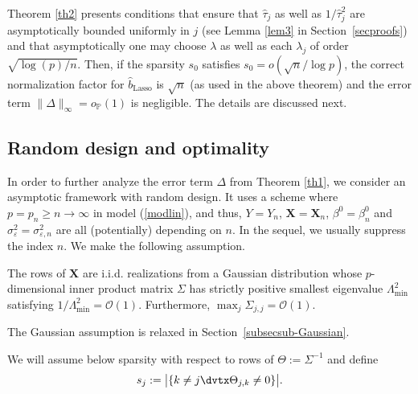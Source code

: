 \documentclass[aos,MSNbibl,dvips]{arximspdf}
\newcommand{\PP}{\mathbb{P}}
\newcommand{\eps}{\varepsilon}
\newcommand{\bx}{\mathbf{X}}
\begin{document}
Theorem \ref{th2} presents conditions that ensure that $\hat\tau_j$ as
well as $1/ \hat\tau_j^2$ are asymptotically bounded uniformly in $j$
(see Lemma \ref{lem3} in Section~\ref{secproofs}) and that
asymptotically one may choose $\lambda$
as well as each
$\lambda_j $ of order $ \sqrt{\log(p)/n}$.
Then, if the sparsity $s_0$ satisfies
$s_0=o(\sqrt n / \log p )$,
the correct
normalization
factor for $\hat{b}_{\mathrm{Lasso}}$ is $\sqrt{n}$ (as used in the
above theorem) and the error term
$\|\Delta\|_{\infty} = o_{\PP}(1)$ is negligible. The
details are discussed next.

\subsection{Random design and
optimality}\label{subsecranddesign}

In order to further analyze the error term $\Delta$ from Theorem
\ref{th1}, we consider an asymptotic
framework with random design.
It uses a scheme where $p = p_n \ge n \to\infty$ in
model (\ref{modlin}), and thus, $Y = Y_n$, $\bx= \bx_n$, $\beta^0 =
\beta^0_n$ and $\sigma^2_{\eps} = \sigma^2_{\eps,n}$ are all (potentially)
depending on $n$. In the sequel, we usually suppress the index
$n$. We make the following assumption.
%
\begin{longlist}[(A2)]
%
\item[(A2)] The rows of $\bx$ are
i.i.d. realizations from a Gaussian distribution whose
$p$-dimensional inner product matrix $\Sigma$ has strictly positive
smallest eigenvalue
$\Lambda^2_{\mathrm{min}} $ satisfying $1/ \Lambda_\mathrm{min}^2 =
{\mathcal O} (1) $.
Furthermore, $\max_j \Sigma_{j,j} = {\mathcal O}(1)$.
\end{longlist}
%
The Gaussian assumption is relaxed in Section~\ref{subsecsub-Gaussian}.

We will assume below sparsity with respect to rows of $\Theta:=
\Sigma^{-1}$ and define
%
\[
s_{j}: = \bigl| \{ k \neq j \dvtx \Theta_{j, k} \neq0 \} \bigr|.
\]
%
\end{document}
